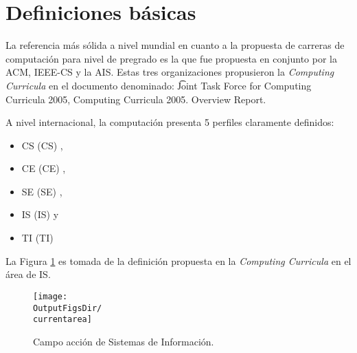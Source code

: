 \section{Definiciones básicas}\label{sec:cs-definiciones-basicas}
La referencia más sólida a nivel mundial en cuanto a la propuesta de carreras de computación 
para nivel de pregrado es la que fue propuesta en conjunto por la \ac{ACM}, 
\ac{IEEE-CS} y la \ac{AIS}. Estas tres organizaciones propusieron la 
{\it Computing Curricula} en el documento denominado: 
{\t Joint Task Force for Computing Curricula 2005, Computing Curricula 2005. Overview Report}\cite{ComputingCurricula2005}.

A nivel internacional, la computación presenta 5 perfiles claramente definidos: 
\begin{itemize}
\item \acl{CS} (\acs{CS}) \cite{ComputerScience2001},
\item \acl{CE} (\acs{CE}) \cite{ComputerEngineering2004},
\item \acl{SE} (\acs{SE}) \cite{SoftwareEngineering2004},
\item \acl{IS} (\acs{IS}) \cite{InformationSystems2002Journal} y 
\item \acl{TI} (\acs{TI}) \cite{InformationTechnology2005}
\end{itemize}


La Figura \ref{fig.is} es tomada de la definición propuesta en la {\it Computing Curricula}
\cite{ComputerScience2001,ComputingCurricula2005} en el área de \ac{IS}. 

\begin{figure}[ht]
   \centering
   \texttt{[image: \\OutputFigsDir/\\currentarea]}
   \caption{Campo acción de Sistemas de Información.}
   \label{fig.is}
\end{figure}

